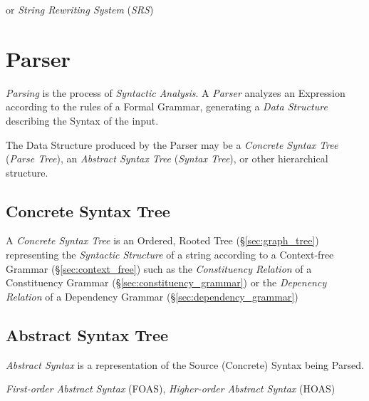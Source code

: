 or \emph{String Rewriting System} (\emph{SRS})



\section{Parser} \label{sec:parser}

\emph{Parsing} is the process of \emph{Syntactic Analysis}. A
\emph{Parser} analyzes an Expression according to the rules of a
Formal Grammar, generating a \emph{Data Structure} describing the
Syntax of the input.

The Data Structure produced by the Parser may be a \emph{Concrete
  Syntax Tree} (\emph{Parse Tree}), an \emph{Abstract Syntax Tree}
(\emph{Syntax Tree}), or other hierarchical structure.



\subsection{Concrete Syntax Tree}\label{sec:concrete_syntax}

A \emph{Concrete Syntax Tree} is an Ordered, Rooted Tree
(\S\ref{sec:graph_tree}) representing the \emph{Syntactic
  Structure} of a string according to a Context-free Grammar
(\S\ref{sec:context_free}) such as the \emph{Constituency Relation}
of a Constituency Grammar (\S\ref{sec:constituency_grammar}) or the
\emph{Depenency Relation} of a Dependency Grammar
(\S\ref{sec:dependency_grammar})



\subsection{Abstract Syntax Tree}\label{sec:abstract_syntax}

\emph{Abstract Syntax} is a representation of the Source (Concrete)
Syntax being Parsed.

\emph{First-order Abstract Syntax} (FOAS), \emph{Higher-order Abstract
  Syntax} (HOAS)



